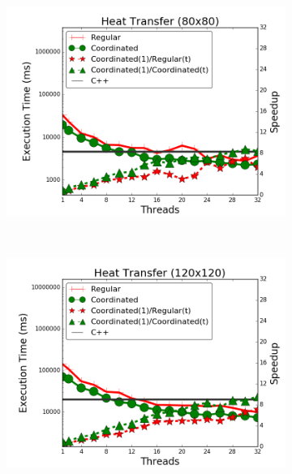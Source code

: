 \begin{figure}[]
        \centering
        \begin{subfigure}[b]{\plotsize\textwidth}
           \includegraphics[width=\textwidth]{experiments/coordination/cmpnew-new-heat-transfer-80.png}
           \label{fig:coordination:coord_ht_80_local}
        \end{subfigure}
        ~
        \begin{subfigure}[b]{\plotsize\textwidth}
           \includegraphics[width=\textwidth]{experiments/coordination/cmpnew-new-heat-transfer-120.png}
           \label{fig:coordination:coord_ht_120_local}
        \end{subfigure} \\
        \label{fig:coordination:results_ht_new}
\end{figure}
